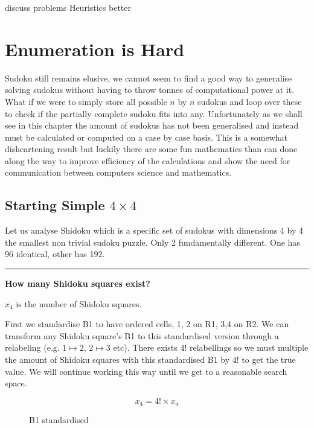 \documentclass[a4paper,11pt]{report}
\newcounter{row}
\newcounter{col}
\newcounter{rowa}
\newcounter{cola}
\newcommand\setrowa[4]{
  \setcounter{cola}{1}
  \foreach \n in {#1, #2, #3, #4} {
    \edef\x{\value{cola} - 0.5}
    \edef\y{4.5 - \value{rowa}}
    \node[anchor=center] at (\x, \y) {\n};
    \stepcounter{cola}
  }
  \stepcounter{rowa}
}
\begin{document}
discuss problems 
Heuristics better

\chapter{Enumeration is Hard}

Sudoku still remains elusive, we cannot seem to find a good way to generalise solving sudokus without having to throw tonnes of computational power at it. What if we were to simply store all possible $n$ by $n$ sudokus and loop over these to check if the partially complete sudoku fits into any. Unfortunately as we shall see in this chapter the amount of sudokus has not been generalised and instead must be calculated or computed on a case by case basis. This is a somewhat disheartening result but luckily there are some fun mathematics than can done along the way to improve efficiency of the calculations and show the need for communication between computers science and mathematics.

\section{Starting Simple $4 \times 4$}
Let us analyse Shidoku which is a specific set of sudokus with dimensions 4 by 4 the smallest non trivial sudoku puzzle. Only 2 fundamentally different. One has 96 identical, other has 192. 

\noindent\rule{4cm}{0.4pt}

\textbf{How many Shidoku squares exist?}

$x_4$ is the number of Shidoku squares.

First we standardise B1 to have ordered cells, 1, 2 on R1, 3,4 on R2. We can transform any Shidoku square's B1 to this standardised version through a relabeling (e.g. $1 \mapsto 2$, $2\mapsto 3$ etc). There exists 4! relabellings so we must multiple the amount of Shidoku squares with this standardised B1 by 4! to get the true value. We will continue working this way until we get to a reasonable search space.

\begin{equation}
x_4 = 4!\times x_a
\end{equation}

\begin{figure}[h]
\centering
{}
\caption{B1 standardised}
\label{fig:shidokurelabelling}
\end{figure}
\end{document}

